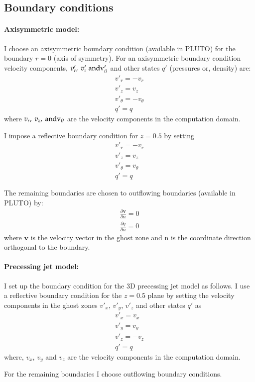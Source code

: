\subsection{Boundary conditions}
\paragraph{Axisymmetric model:}
I choose an axisymmetric boundary condition (available in PLUTO) for the boundary $r=0$ (axis of symmetry). For an axisymmetric boundary condition velocity components, $v'_r, \ v'_z \ \rm and v'_{\theta}$ and other states $q'$ (pressures or, density) are:
\begin{eqnarray}
v'_r = -v_r  \\
v'_z = v_z \\
v'_{\theta} = -v_{\theta}  \\
q' = q
\end{eqnarray}
where $v_r, \ v_z, \ \rm and v_{\theta}$ are the velocity components in the computation domain. 

I impose a reflective boundary condition for $z=0.5$ by setting 
\begin{eqnarray}
v'_r = -v_r  \\
v'_z = v_z \\
v'_{\theta} = v_{\theta}  \\
q' = q
\end{eqnarray}

The remaining boundaries are chosen to outflowing boundaries (available in PLUTO) by: 
\begin{eqnarray}
\frac{\partial\textbf{v}}{\partial n}= 0 \\
\frac{\partial q}{\partial n}= 0
\end{eqnarray}
where $\textbf{v}$ is the velocity vector in the ghost zone and n is the coordinate direction orthogonal to the boundary. 

\paragraph{Precessing jet model:} 
I set up the boundary condition for the 3D precessing jet model as follows. I use a reflective boundary condition for the $z = 0.5$ plane by setting the velocity components in the ghost zones $v'_x$,  $v'_y$, $v'_z$ and other states $q'$ as 
\begin{eqnarray}
v'_x = v_x  \\
v'_y = v_y \\
v'_z = -v_z  \\
q' = q
\end{eqnarray}
where, $v_x$, $v_y$ and $v_z$ are the velocity components in the computation domain. 

For the remaining boundaries I choose outflowing boundary conditions. 

